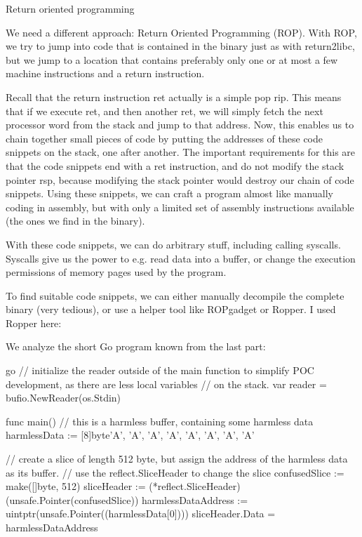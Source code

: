  Return oriented programming

We need a different approach: Return Oriented Programming (ROP). With ROP, we try to jump into code that is contained
in the binary just as with return2libc, but we jump to a location that contains preferably only one or at most a few
machine instructions and a return instruction.

Recall that the return instruction ret actually is a simple pop rip. This means that if we execute ret, and then
another ret, we will simply fetch the next processor word from the stack and jump to that address. Now, this enables
us to chain together small pieces of code by putting the addresses of these code snippets on the stack, one after
another. The important requirements for this are that the code snippets end with a ret instruction, and do not modify
the stack pointer rsp, because modifying the stack pointer would destroy our chain of code snippets. Using these
snippets, we can craft a program almost like manually coding in assembly, but with only a limited set of assembly
instructions available (the ones we find in the binary).

With these code snippets, we can do arbitrary stuff, including calling syscalls. Syscalls give us the power to e.g.
read data into a buffer, or change the execution permissions of memory pages used by the program.

To find suitable code snippets, we can either manually decompile the complete binary (very tedious), or use a helper
tool like ROPgadget or Ropper. I used Ropper here:


We analyze the short Go program known from the last part:

go
// initialize the reader outside of the main function to simplify POC development, as there are less local variables
// on the stack.
var reader = bufio.NewReader(os.Stdin)

func main() 
    // this is a harmless buffer, containing some harmless data
    harmlessData := [8]byte'A', 'A', 'A', 'A', 'A', 'A', 'A', 'A'

    // create a slice of length 512 byte, but assign the address of the harmless data as its buffer.
    // use the reflect.SliceHeader to change the slice
    confusedSlice := make([]byte, 512)
    sliceHeader := (*reflect.SliceHeader)(unsafe.Pointer(confusedSlice))
    harmlessDataAddress := uintptr(unsafe.Pointer((harmlessData[0])))
    sliceHeader.Data = harmlessDataAddress


